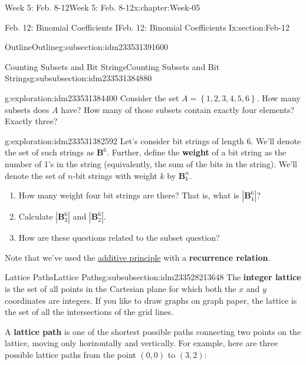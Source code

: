 \documentclass[oneside,10pt,]{book}
\newcommand{\terminology}[1]{\textbf{#1}}
\numberwithin{equation}{section}
\newcommand{\set}[1]{\left\{ {#1} \right\}}
\newcommand{\card}[1]{\left| #1 \right|}
\begin{document}
\begin{chapterptx}{Week 5: Feb. 8-12}{}{Week 5: Feb. 8-12}{}{}{x:chapter:Week-05}
\begin{sectionptx}{Feb. 12: Binomial Coefficients I}{}{Feb. 12: Binomial Coefficients I}{}{}{x:section:Feb-12}
\begin{subsectionptx}{Outline}{}{Outline}{}{}{g:subsection:idm233531391600}
\begin{subsubsectionptx}{Counting Subsets and Bit Strings}{}{Counting Subsets and Bit Strings}{}{}{g:subsubsection:idm233531384880}
\begin{exploration}{}{g:exploration:idm233531384400}
Consider the set \(A=\set{1,2,3,4,5,6}\). How many subsets does \(A\) have? How many of those subsets contain exactly four elements? Exactly three?%
\end{exploration}%
\begin{exploration}{}{g:exploration:idm233531382592}%
Let's consider bit strings of length 6. We'll denote the set of such strings as \(\mathbf{B}^6\). Further, define the \terminology{weight} of a bit string as the number of 1's in the string (equivalently, the sum of the bits in the string). We'll denote the set of \(n\)-bit strings with weight \(k\) by \(\mathbf{B}^n_k\).%
%
\begin{enumerate}
\item{}How many weight four bit strings are there? That is, what is \(\card{\mathbf{B}^6_4}\)?%
\item{}Calculate \(\card{\mathbf{B}^6_3}\) and \(\card{\mathbf{B}^6_2}\).%
\item{}How are these questions related to the subset question?%
\end{enumerate}
\end{exploration}%
Note that we've used the \hyperref[x:assemblage:additive-principle]{additive principle} with a \terminology{recurrence relation}.%
\end{subsubsectionptx}
%
%
\typeout{************************************************}
\typeout{************************************************}
%
\begin{subsubsectionptx}{Lattice Paths}{}{Lattice Paths}{}{}{g:subsubsection:idm233528213648}
 The \terminology{integer lattice} is the set of all points in the Cartesian plane for which both the \(x\) and \(y\) coordinates are integers. If you like to draw graphs on graph paper, the lattice is the set of all the intersections of the grid lines.%
\par
A \terminology{lattice path}  is one of the shortest possible paths connecting two points on the lattice, moving only horizontally and vertically. For example, here are three possible lattice paths from the point \((0,0)\) to \((3,2)\):%
\begin{sidebyside}{3}{0.0166666666666667}{0.0166666666666667}{0.0333333333333333}%
\begin{sbspanel}{0.3}%

\end{sbspanel}
\end{sidebyside}
\end{subsubsectionptx}
\end{subsectionptx}
\end{sectionptx}
\end{chapterptx}
\end{document}
